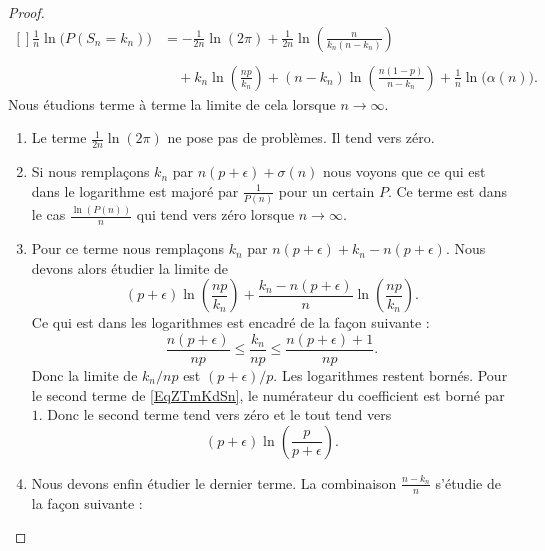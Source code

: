 \begin{proof}
    \begin{equation}
        \begin{aligned}[]
        \frac{1}{ n }\ln\big( P(S_n=k_n) \big)&=-\frac{1}{ 2n }\ln(2\pi)+\frac{1}{ 2n }\ln\left( \frac{ n }{ k_n(n-k_n) } \right)\\
        \\&\quad+k_n\ln\left( \frac{ np }{ k_n } \right)+(n-k_n)\ln\left( \frac{ n(1-p) }{ n-k_n } \right)+\frac{1}{ n }\ln\big( \alpha(n) \big).
        \end{aligned}
    \end{equation}
    Nous étudions terme à terme la limite de cela lorsque \( n\to \infty\).
    \begin{enumerate}
        \item
            Le terme \( \frac{1}{ 2n }\ln(2\pi)\) ne pose pas de problèmes. Il tend vers zéro.
        \item
            Si nous remplaçons \( k_n\) par \( n(p+\epsilon)+\sigma(n)\) nous voyons que ce qui est dans le logarithme est majoré par \( \frac{1}{ P(n) }\) pour un certain \( P\). Ce terme est dans le cas \( \frac{ \ln(P(n)) }{ n }\) qui tend vers zéro lorsque \( n\to \infty\).
        \item
            Pour ce terme nous remplaçons \( k_n\) par \( n(p+\epsilon)+k_n-n(p+\epsilon)\). Nous devons alors étudier la limite de
            \begin{equation}    \label{EqZTmKdSn}
                (p+\epsilon)\ln\left( \frac{ np }{ k_n } \right)+\frac{ k_n-n(p+\epsilon) }{ n }\ln\left( \frac{ np }{ k_n } \right).
            \end{equation}
            Ce qui est dans les logarithmes est encadré de la façon suivante :
            \begin{equation}
                \frac{ n(p+\epsilon) }{ np }\leq\frac{ k_n }{ np }\leq \frac{ n(p+\epsilon)+1 }{ np }.
            \end{equation}
            Donc la limite de \( k_n/np\) est \( (p+\epsilon)/p\). Les logarithmes restent bornés. Pour le second terme de \eqref{EqZTmKdSn}, le numérateur du coefficient est borné par \( 1\). Donc le second terme tend vers zéro et le tout tend vers
            \begin{equation}
                (p+\epsilon)\ln\left( \frac{ p }{ p+\epsilon } \right).
            \end{equation}
        \item
            Nous devons enfin étudier le dernier terme. La combinaison \( \frac{ n-k_n }{ n }\) s'étudie de la façon suivante :

\end{enumerate}
\end{proof}
